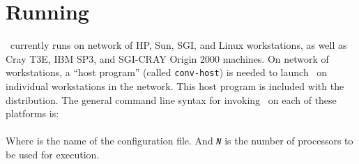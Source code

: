 
%
%
%
%
%
%
%
%
%
%
%
%
%
%
% 

\section{Running \NAMD}
\label{section:run}

\NAMD\ currently runs on network of HP, Sun, SGI, and Linux workstations, as
well as Cray T3E, IBM SP3, and SGI-CRAY Origin 2000 machines. On network
of workstations, a ``host program'' (called {\tt conv-host}) is needed to
launch \NAMD\ on individual workstations in the network. This host program
is included with the distribution. The general command line syntax for
invoking \NAMD\ on each of these platforms is:\\
\\
Where {\tt <config-file>} is the name of the configuration file. 
And {\tt{\em N}} is the number of processors to be used for execution.

